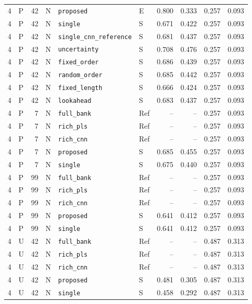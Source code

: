 \documentclass[10pt,a4paper]{article}
\begin{document}
\begin{longtable}{rlrlllrrrr}
4 & P & 42 & N & \texttt{proposed} & E & 0.800 & 0.333 & 0.257 & 0.093 \\
4 & P & 42 & N & \texttt{single} & S & 0.671 & 0.422 & 0.257 & 0.093 \\
4 & P & 42 & N & \texttt{single\_cnn\_reference} & S & 0.681 & 0.437 & 0.257 & 0.093 \\
4 & P & 42 & N & \texttt{uncertainty} & S & 0.708 & 0.476 & 0.257 & 0.093 \\
4 & P & 42 & N & \texttt{fixed\_order} & S & 0.686 & 0.439 & 0.257 & 0.093 \\
4 & P & 42 & N & \texttt{random\_order} & S & 0.685 & 0.442 & 0.257 & 0.093 \\
4 & P & 42 & N & \texttt{fixed\_length} & S & 0.666 & 0.424 & 0.257 & 0.093 \\
4 & P & 42 & N & \texttt{lookahead} & S & 0.683 & 0.437 & 0.257 & 0.093 \\
4 & P & 7 & N & \texttt{full\_bank} & Ref & -- & -- & 0.257 & 0.093 \\
4 & P & 7 & N & \texttt{rich\_pls} & Ref & -- & -- & 0.257 & 0.093 \\
4 & P & 7 & N & \texttt{rich\_cnn} & Ref & -- & -- & 0.257 & 0.093 \\
4 & P & 7 & N & \texttt{proposed} & S & 0.685 & 0.455 & 0.257 & 0.093 \\
4 & P & 7 & N & \texttt{single} & S & 0.675 & 0.440 & 0.257 & 0.093 \\
4 & P & 99 & N & \texttt{full\_bank} & Ref & -- & -- & 0.257 & 0.093 \\
4 & P & 99 & N & \texttt{rich\_pls} & Ref & -- & -- & 0.257 & 0.093 \\
4 & P & 99 & N & \texttt{rich\_cnn} & Ref & -- & -- & 0.257 & 0.093 \\
4 & P & 99 & N & \texttt{proposed} & S & 0.641 & 0.412 & 0.257 & 0.093 \\
4 & P & 99 & N & \texttt{single} & S & 0.641 & 0.412 & 0.257 & 0.093 \\
4 & U & 42 & N & \texttt{full\_bank} & Ref & -- & -- & 0.487 & 0.313 \\
4 & U & 42 & N & \texttt{rich\_pls} & Ref & -- & -- & 0.487 & 0.313 \\
4 & U & 42 & N & \texttt{rich\_cnn} & Ref & -- & -- & 0.487 & 0.313 \\
4 & U & 42 & N & \texttt{proposed} & S & 0.481 & 0.305 & 0.487 & 0.313 \\
4 & U & 42 & N & \texttt{single} & S & 0.458 & 0.292 & 0.487 & 0.313 \\

\end{longtable}
\end{document}
